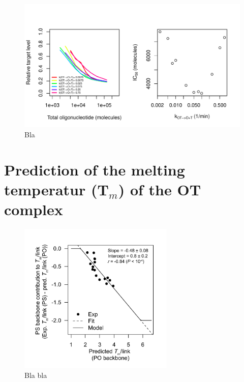 \documentclass[a4paper,11pt]{article}
\begin{document}
\begin{figure}[!h]
\begin{center}
\includegraphics[width=\textwidth]{SuppFile1-IC50.pdf}
\end{center}
\caption{Bla}\label{fig:figIC50}
\end{figure}
\newpage

\section{Prediction of the melting temperatur ($\mathbf{T}_m$) of the $\mathbf{OT}$ complex}
\begin{figure}[!h]
\begin{center}
\includegraphics[width=0.66\textwidth]{SuppFig_PS.pdf}
\end{center}
\caption{Bla bla}\label{fig:figPS}
\end{figure}
\end{document}
